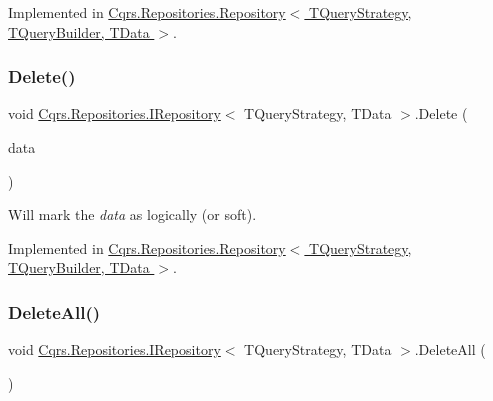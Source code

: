 Implemented in \hyperlink{classCqrs_1_1Repositories_1_1Repository_a2af8103cc2946317f8ee9ede643bbc68_a2af8103cc2946317f8ee9ede643bbc68}{Cqrs.\+Repositories.\+Repository$<$ T\+Query\+Strategy, T\+Query\+Builder, T\+Data $>$}.

\mbox{\label{interfaceCqrs_1_1Repositories_1_1IRepository_a71c60de3588a757da2d25350c98374fd_a71c60de3588a757da2d25350c98374fd}} 
\subsubsection{\texorpdfstring{Delete()}{Delete()}}
{\footnotesize\ttfamily void \hyperlink{interfaceCqrs_1_1Repositories_1_1IRepository}{Cqrs.\+Repositories.\+I\+Repository}$<$ T\+Query\+Strategy, T\+Data $>$.Delete (\begin{DoxyParamCaption}\item[{T\+Data}]{data }\end{DoxyParamCaption})}



Will mark the {\itshape data}  as logically (or soft). 



Implemented in \hyperlink{classCqrs_1_1Repositories_1_1Repository_ac9d88baa6afcea85553fd233ba406e48_ac9d88baa6afcea85553fd233ba406e48}{Cqrs.\+Repositories.\+Repository$<$ T\+Query\+Strategy, T\+Query\+Builder, T\+Data $>$}.

\mbox{\label{interfaceCqrs_1_1Repositories_1_1IRepository_a0da5f756a0fd184dc51a81741f82734a_a0da5f756a0fd184dc51a81741f82734a}} 
\subsubsection{\texorpdfstring{Delete\+All()}{DeleteAll()}}
{\footnotesize\ttfamily void \hyperlink{interfaceCqrs_1_1Repositories_1_1IRepository}{Cqrs.\+Repositories.\+I\+Repository}$<$ T\+Query\+Strategy, T\+Data $>$.Delete\+All (\begin{DoxyParamCaption}{ }\end{DoxyParamCaption})}




